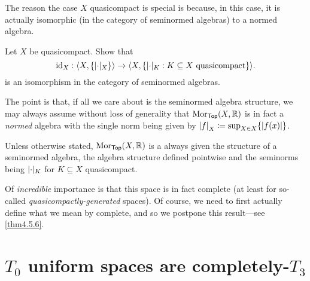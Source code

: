 \begin{exm}
The reason the case $X$ quasicompact is special is because, in this case, it is actually isomorphic (in the category of seminormed algebras) to a normed algebra.
\begin{exr}
Let $X$ be quasicompact.  Show that
\begin{equation}
\id _X:\coord{X,\{ \norm _X\}}\rightarrow \coord{X,\{ \norm _K:K\subseteq X\text{ quasicompact}\}} .
\end{equation}
is an isomorphism in the category of seminormed algebras.
\begin{rmk}
The point is that, if all we care about is the seminormed algebra structure, we may always assume without loss of generality that $\operatorname{Mor} _{\mathsf{Top}}(X,\mathbb{R} )$ is in fact a \emph{normed} algebra with the single norm being given by $\norm[f]_X\coloneqq \sup _{X\in X}\{ \abs{f(x)}\}$.
\end{rmk}
\end{exr}
\begin{textequation}
Unless otherwise stated, $\operatorname{Mor} _{\mathsf{Top}}(X,\mathbb{R} )$ is a always given the structure of a seminormed algebra, the algebra structure defined pointwise and the seminorms being $\norm _K$ for $K\subseteq X$ quasicompact.
\end{textequation}

Of \emph{incredible} importance is that this space is in fact complete (at least for so-called \emph{quasicompactly-generated} spaces).  Of course, we need to first actually define what we mean by complete, and so we postpone this result---see \cref{thm4.5.6}.
\end{exm}

\section{$T_0$ uniform spaces are completely-$T_3$}

